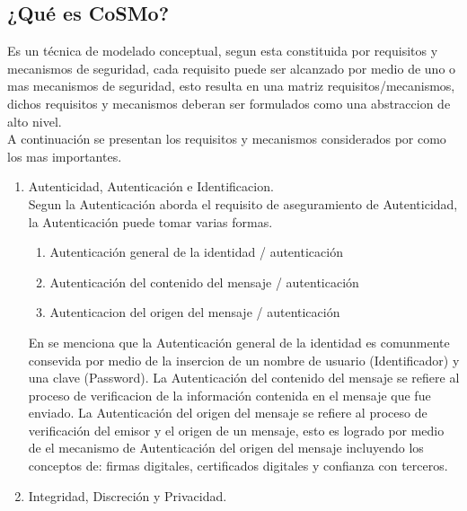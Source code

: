 \documentclass[runningheads,a4paper]{llncs}
\begin{document}
\subsection{¿Qué es \gls{CoSMo}?}
Es un técnica de modelado conceptual, segun \cite{CoSMoIntroduction} esta constituida por requisitos y mecanismos de seguridad, cada requisito puede ser alcanzado por medio de uno o mas mecanismos de seguridad, esto resulta en una matriz requisitos/mecanismos, dichos requisitos y mecanismos deberan ser formulados como una abstraccion de alto nivel.\\

A continuación se presentan los requisitos y mecanismos considerados por \cite{CoSMoIntroduction} como los mas importantes.

\begin{enumerate}
	\item Autenticidad, Autenticación e Identificacion.\\
	
	Segun \cite{CoSMoIntroduction} la Autenticación aborda el requisito de aseguramiento de Autenticidad, la Autenticación puede tomar varias formas.
	
	\begin{enumerate}
		\item Autenticación general de la identidad / autenticación
		\item Autenticación del contenido del mensaje  / autenticación
		\item Autenticacion del origen del mensaje / autenticación\\
	\end{enumerate}
	
En \cite{CoSMoIntroduction} se menciona que la Autenticación general de la identidad es comunmente consevida por medio de la insercion de un nombre de usuario (\gls{Identificador}) y una clave (\gls{Password}). La Autenticación del contenido del mensaje se refiere al proceso de verificacion de la información contenida en el mensaje que fue enviado. La Autenticación del origen del mensaje se refiere al proceso de verificación del emisor y el origen de un mensaje, esto es logrado por medio de el mecanismo de Autenticación del origen del mensaje incluyendo los conceptos de: firmas digitales, certificados digitales y confianza con terceros.\\

	\item Integridad, Discreción y Privacidad.\\
	

\end{enumerate}
\end{document}
